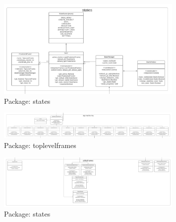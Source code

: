 \documentclass[parskip=full]{report} %
\begin{document}
\hypertarget{states}{
\begin{figure}[hbt!]
  \centering
\includegraphics[width=0.8\textwidth]
        {pictures/states.png}
  \caption{Package: states}
  \label{fig:mvc}
\end{figure}
}

\hypertarget{toplevelframes}{
\begin{figure}[hbt!]
  \centering
\includegraphics[width=0.8\textwidth]
        {pictures/toplevelframes.png}
  \caption{Package: toplevelframes}
  \label{fig:mvc}
\end{figure}
}

\hypertarget{utilityframes}{
\begin{figure}[hbt!]
  \centering
\includegraphics[width=0.8\textwidth]
        {pictures/utilityframes.png}
  \caption{Package: states}
  \label{fig:mvc}
\end{figure}
}
\end{document}
